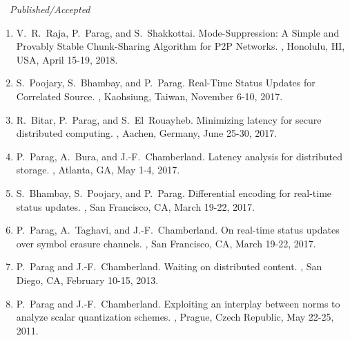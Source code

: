 \documentclass[11pt]{article}
\newcommand{\blankline}{\quad\pagebreak[2]}
\begin{document}
\blankline

 $\quad${\it Published/Accepted}
\begin{enumerate}
\addtocounter{enumi}{9}
\item [{\bf [C16]}] V.~R.~Raja, P.~Parag, and S.~Shakkottai. 
\newblock 	Mode-Suppression: A Simple and Provably Stable Chunk-Sharing Algorithm for P2P Networks. 
, 
Honolulu, HI, USA, April 15-19, 2018.

\item [{\bf [C15]}] S.~Poojary, S.~Bhambay, and P.~Parag. 
\newblock 	Real-Time Status Updates for Correlated Source. 
, 
Kaohsiung, Taiwan, November 6-10, 2017. 

\item [{\bf [C14]}] R.~Bitar, P.~Parag, and S.~El~Rouayheb. 
\newblock 	Minimizing latency for secure distributed computing.  
, 
Aachen, Germany, June 25-30, 2017.

\item [{\bf [C13]}] P.~Parag, A.~Bura, and J.-F.~Chamberland.
\newblock 	Latency analysis for distributed storage. 
, 
Atlanta, GA, May 1-4, 2017.  	

\item [{\bf [C12]}] S.~Bhambay, S.~Poojary, and P.~Parag.
\newblock 	Differential encoding for real-time status updates. 
, 
San Francisco, CA, March 19-22, 2017. 	

\item [{\bf [C11]}] P.~Parag, A.~Taghavi, and J.-F.~Chamberland.
\newblock 	On real-time status updates over symbol erasure channels. 
, 
San Francisco, CA, March 19-22, 2017. 	

\item [{\bf [C10]}] P.~Parag and J.-F.~Chamberland.
\newblock 	Waiting on distributed content.
, 
San Diego, CA, February 10-15, 2013. 	

\item [{\bf [C9]}] P.~Parag and J.-F.~Chamberland.
\newblock Exploiting an interplay between norms to analyze scalar quantization schemes.
, 
Prague, Czech Republic, May 22-25, 2011. 


\end{enumerate}
\end{document}
